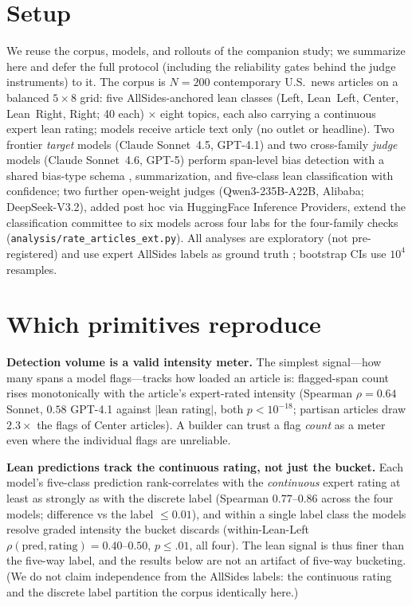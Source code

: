 \documentclass{article}
\begin{document}
\section{Setup}
We reuse the corpus, models, and rollouts of the companion study; we
summarize here and defer the full protocol (including the reliability
gates behind the judge instruments) to it. The corpus is $N{=}200$
contemporary U.S.\ news articles on a balanced $5\times8$ grid: five
AllSides-anchored lean classes (Left, Lean~Left, Center, Lean~Right,
Right; 40 each) $\times$ eight topics, each also carrying a continuous
expert lean rating; models receive article text only (no outlet or
headline). Two frontier \emph{target} models (Claude Sonnet~4.5,
GPT-4.1) and two cross-family \emph{judge} models (Claude Sonnet~4.6,
GPT-5) perform span-level bias detection with a shared bias-type schema
\citep{spinde2021babe,hamborg2019automated}, summarization, and
five-class lean classification with confidence; two further open-weight
judges (Qwen3-235B-A22B, Alibaba; DeepSeek-V3.2), added post hoc via
HuggingFace Inference Providers, extend the classification committee to
six models across four labs for the four-family checks
(\texttt{analysis/rate\_articles\_ext.py}). All analyses are
exploratory (not pre-registered) and use expert AllSides labels as
ground truth \citep{baly2020detect}; bootstrap CIs use $10^4$ resamples.

\section{Which primitives reproduce}

\textbf{Detection volume is a valid intensity meter.} The simplest
signal---how many spans a model flags---tracks how loaded an article is:
flagged-span count rises monotonically with the article's expert-rated
intensity (Spearman $\rho{=}0.64$ Sonnet, $0.58$ GPT-4.1 against
$|\text{lean rating}|$, both $p{<}10^{-18}$; partisan articles draw
$2.3\times$ the flags of Center articles). A builder can trust a flag
\emph{count} as a meter even where the individual flags are unreliable.

\textbf{Lean predictions track the continuous rating, not just the
bucket.} Each model's five-class prediction rank-correlates with the
\emph{continuous} expert rating at least as strongly as with the discrete
label (Spearman $0.77$--$0.86$ across the four models; difference vs the
label $\le 0.01$), and within a single label class the models resolve
graded intensity the bucket discards (within-Lean-Left
$\rho(\text{pred},\text{rating}){=}0.40$--$0.50$, $p\le.01$, all four).
The lean signal is thus finer than the five-way label, and the results
below are not an artifact of five-way bucketing. (We do not claim
independence from the AllSides labels: the continuous rating and the
discrete label partition the corpus identically here.)
\end{document}
